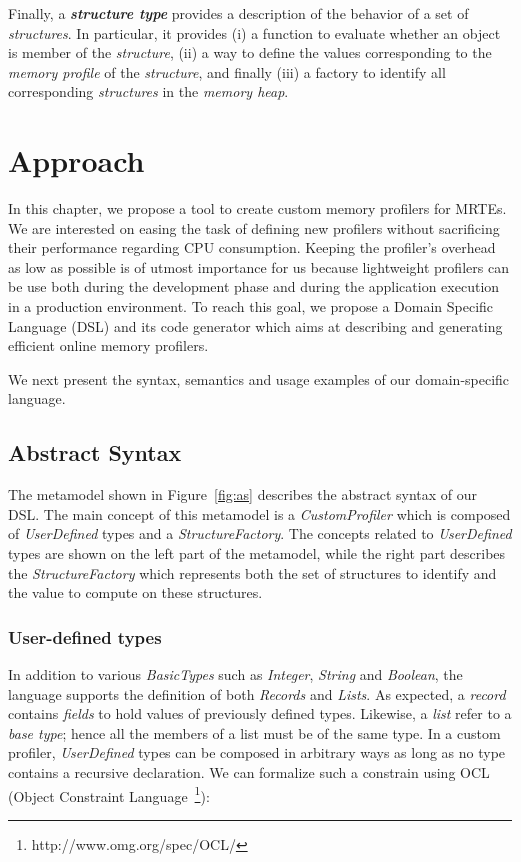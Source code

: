 Finally, a \textbf{\textit{structure type}} provides a description of the behavior of a set of \textit{structures}. 
In particular, it provides (i) a function to evaluate whether an object is member of the \textit{structure}, (ii) a way to define the values corresponding to the \textit{memory profile} of the \textit{structure}, and finally (iii) a factory to identify all  corresponding \textit{structures} in the \textit{memory heap}.



\section{Approach}\label{sec:approach}

In this chapter, we propose a tool to create custom memory profilers for MRTEs.
We are interested on easing the task of defining new profilers without sacrificing their performance regarding CPU consumption.
Keeping the profiler's overhead as low as possible is of utmost importance for us because lightweight profilers can be use both during the development phase and during the application execution in a production environment.
To reach this goal, we propose a Domain Specific Language (DSL) and its code generator which aims at describing and generating efficient online memory profilers. 

We next present the syntax, semantics and usage examples of our domain-specific language.

\subsection{Abstract Syntax}\label{sec:abstract-syntax}

The metamodel shown in Figure~\ref{fig:as} describes the abstract syntax of our DSL.
The main concept of this metamodel is a \textit{CustomProfiler} which is composed of \textit{UserDefined} types and a \textit{StructureFactory}.
The concepts related to \textit{UserDefined} types are shown on the left part of the metamodel, while the right part describes the \textit{StructureFactory} which represents both the set of  structures to identify and the value to compute on these structures.

\subsubsection{User-defined types}
In addition to various \textit{BasicTypes} such as \textit{Integer}, \textit{String} and \textit{Boolean}, the language supports the definition of both \textit{Records} and \textit{Lists}.
As expected, a \textit{record} contains \textit{fields} to hold values of previously defined types.
Likewise, a \textit{list} refer to a \textit{base type}; hence all the members of a list must be of the same type.
In a custom profiler, \textit{UserDefined} types can be composed in arbitrary ways as long as no type contains a recursive declaration.
We can formalize such a constrain using OCL (Object Constraint Language~\footnote{http://www.omg.org/spec/OCL/}):

